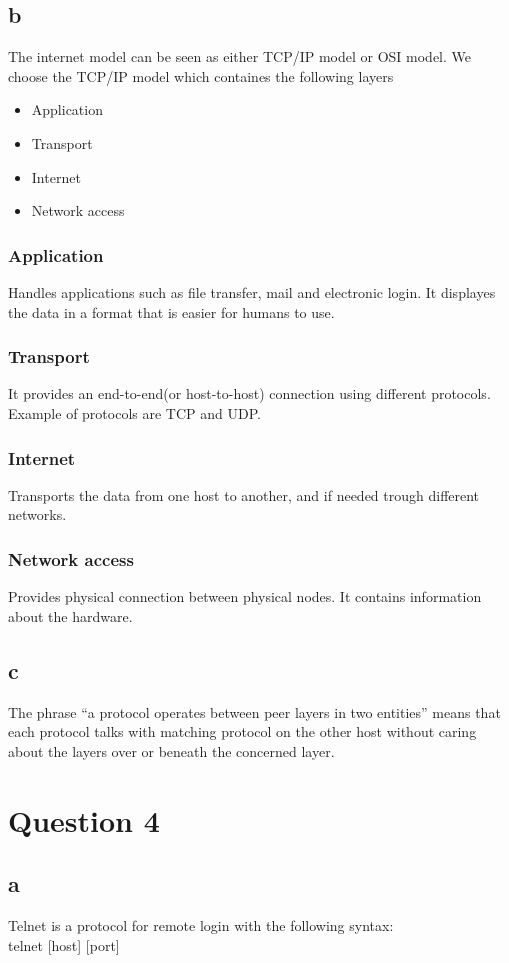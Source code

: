 \documentclass[oneside,a4paper,10pt]{report}
\begin{document}
\subsection{b}
The internet model can be seen as either TCP/IP model or OSI model.
We choose the TCP/IP model which containes the following layers
\begin{itemize}
  \item Application
  \item Transport
  \item Internet
 \item Network access 
\end{itemize}

\subsubsection{Application}
Handles applications such as file transfer, mail and electronic login.
It displayes the data in a format that is easier for humans to use.

\subsubsection{Transport}
It provides an end-to-end(or host-to-host) connection using different protocols.
Example of protocols are TCP and UDP.

\subsubsection{Internet}
Transports the data from one host to another, and if needed trough different networks.
\subsubsection{Network access}
Provides physical connection between physical nodes.
It contains information about the hardware.
\subsection{c}
The phrase “a protocol operates between peer layers in two entities” means that each protocol talks with matching protocol on the other host without caring about the layers over or beneath the concerned layer.

\section{Question 4}
\subsection{a}
Telnet is a protocol for remote login with the following syntax: \\
telnet [host] [port]
\end{document}
